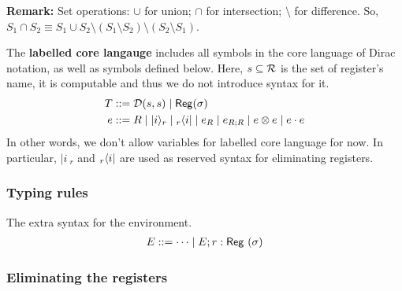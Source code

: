 \textbf{Remark: } Set operations: $\cup$ for union; $\cap$ for intersection; $\setminus$ for difference. So,
$ S_1 \cap S_2 \equiv S_1 \cup S_2 \setminus (S_1 \setminus S_2) \setminus (S_2 \setminus S_1) $.

\begin{definition}
  The \textbf{labelled core langauge} includes all symbols in the core language of Dirac notation, as well as symbols defined below.
  Here, $s\subseteq \mathcal{R}$ is the set of register's name, it is computable and thus we do not introduce syntax for it.
  \begin{align*}
    T & ::= \mathcal{D}(s,s) \mid \mathsf{Reg}(\sigma) \\
    e & ::= R \mid |i\rangle_r \mid {}_r\langle i| \mid e_R \mid e_{R;R} \mid  
    e \otimes e \mid e \cdot e \\
  \end{align*}
  In other words, we don't allow variables for labelled core language for now. In particular, $|i\>_r$ and ${}_r\langle i|$ are used as reserved syntax for eliminating registers.
\end{definition}

\subsubsection*{Typing rules}

The extra syntax for the environment.
\begin{gather}
    E ::= \dots \mid E; r : \mathsf{Reg}\ (\sigma)
\end{gather}

\subsubsection*{Eliminating the registers}

